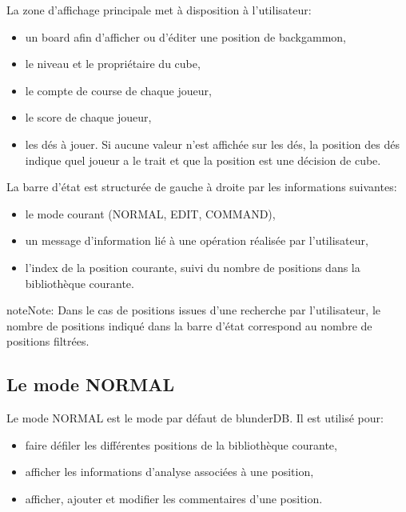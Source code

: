 \documentclass[letterpaper,10pt,french]{sphinxmanual}
\begin{document}
\sphinxAtStartPar
La zone d’affichage principale met à disposition à l’utilisateur:
\begin{itemize}
\item {} 
\sphinxAtStartPar
un board afin d’afficher ou d’éditer une position de backgammon,

\item {} 
\sphinxAtStartPar
le niveau et le propriétaire du cube,

\item {} 
\sphinxAtStartPar
le compte de course de chaque joueur,

\item {} 
\sphinxAtStartPar
le score de chaque joueur,

\item {} 
\sphinxAtStartPar
les dés à jouer. Si aucune valeur n’est affichée sur les dés, la
position des dés indique quel joueur a le trait et que la position est
une décision de cube.

\end{itemize}

\sphinxAtStartPar
La barre d’état est structurée de gauche à droite par les informations
suivantes:
\begin{itemize}
\item {} 
\sphinxAtStartPar
le mode courant (NORMAL, EDIT, COMMAND),

\item {} 
\sphinxAtStartPar
un message d’information lié à une opération réalisée par l’utilisateur,

\item {} 
\sphinxAtStartPar
l’index de la position courante, suivi du nombre de positions dans la
bibliothèque courante.

\end{itemize}

\begin{sphinxadmonition}{note}{Note:}
\sphinxAtStartPar
Dans le cas de positions issues d’une recherche par l’utilisateur, le
nombre de positions indiqué dans la barre d’état correspond au nombre de
positions filtrées.
\end{sphinxadmonition}


\subsection{Le mode NORMAL}
\label{\detokenize{manuel:le-mode-normal}}\label{\detokenize{manuel:mode-normal}}
\sphinxAtStartPar
Le mode NORMAL est le mode par défaut de blunderDB. Il est utilisé pour:
\begin{itemize}
\item {} 
\sphinxAtStartPar
faire défiler les différentes positions de la bibliothèque courante,

\item {} 
\sphinxAtStartPar
afficher les informations d’analyse associées à une position,

\item {} 
\sphinxAtStartPar
afficher, ajouter et modifier les commentaires d’une position.

\end{itemize}
\end{document}
